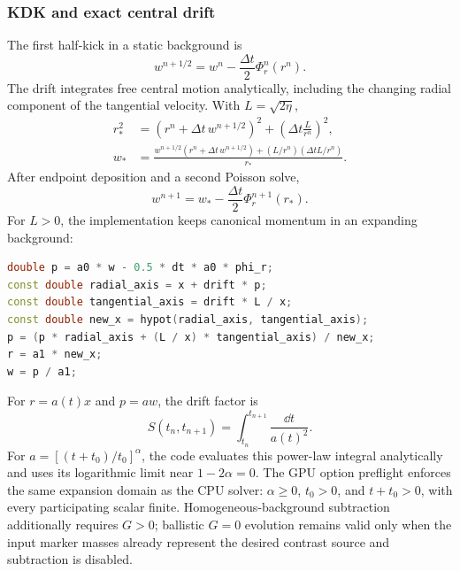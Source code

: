 \subsubsection{KDK and exact central drift}

The first half-kick in a static background is
\begin{equation}
 w^{n+1/2}=w^n-\frac{\Delta t}{2}\Phi_r^n(r^n).
\end{equation}
The drift integrates free central motion analytically, including the changing
radial component of the tangential velocity.  With \(L=\sqrt{2\eta}\),
\begin{align}
 r_*^2&=(r^n+\Delta t\,w^{n+1/2})^2
       +\left(\Delta t\frac{L}{r^n}\right)^2,\\
 w_*&=\frac{w^{n+1/2}(r^n+\Delta t\,w^{n+1/2})
 +(L/r^n)(\Delta t L/r^n)}{r_*}.
\end{align}
After endpoint deposition and a second Poisson solve,
\begin{equation}
 w^{n+1}=w_*-\frac{\Delta t}{2}\Phi_r^{n+1}(r_*).
\end{equation}
For \(L>0\), the implementation keeps canonical momentum in an expanding background:
\par\noindent\begin{minipage}{\linewidth}
\begin{lstlisting}[language=C++]
double p = a0 * w - 0.5 * dt * a0 * phi_r;
const double radial_axis = x + drift * p;
const double tangential_axis = drift * L / x;
const double new_x = hypot(radial_axis, tangential_axis);
p = (p * radial_axis + (L / x) * tangential_axis) / new_x;
r = a1 * new_x;
w = p / a1;
\end{lstlisting}
\end{minipage}
For \(r=a(t)x\) and \(p=aw\), the drift factor is
\begin{equation}
 S(t_n,t_{n+1})=\int_{t_n}^{t_{n+1}}\frac{\dd t}{a(t)^2}.
\end{equation}
For \(a=[(t+t_0)/t_0]^\alpha\), the code evaluates this power-law integral
analytically and uses its logarithmic limit near \(1-2\alpha=0\).  The GPU
option preflight enforces the same expansion domain as the CPU solver:
\(\alpha\geq0\), \(t_0>0\), and \(t+t_0>0\), with every participating scalar
finite.  Homogeneous-background subtraction additionally requires \(G>0\);
ballistic \(G=0\) evolution remains valid only when the input marker masses
already represent the desired contrast source and subtraction is disabled.

